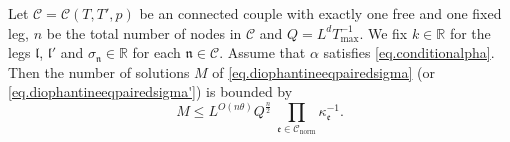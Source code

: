 \begin{prop}\label{prop.counting}
Let $\mathcal{C}=\mathcal{C}(T,T',p)$ be an connected couple with exactly one free and one fixed leg, $n$ be the total number of nodes in $\mathcal{C}$ and $Q=L^{d}T^{-1}_{\text{max}}$. We fix $k\in \mathbb{R}$ for the legs $\mathfrak{l}$, $\mathfrak{l}'$ and $\sigma_{\mathfrak{n}}\in\mathbb{R}$ for each $\mathfrak{n}\in \mathcal{C}$. Assume that $\alpha$ satisfies \eqref{eq.conditionalpha}. Then the number of solutions $M$ of \eqref{eq.diophantineeqpairedsigma} (or \eqref{eq.diophantineeqpairedsigma'}) is bounded by 
\begin{equation}\label{eq.countingbd0}
M\leq L^{O(n\theta)} Q^{\frac{n}{2}}\ \prod_{\mathfrak{e}\in \mathcal{C}_{\text{norm}}} \kappa^{-1}_{\mathfrak{e}}.
\end{equation}
\end{prop}
